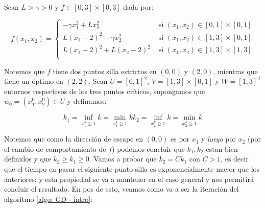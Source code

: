 \begin{remark}
	Sean $L > \gamma > 0$ y $f \in [0,3] \times [0,3]$ dada por:
	
	\begin{equation}
		f(x_1, x_2) = \left\lbrace \begin{array}{cc}
		- \gamma x_1^2 + Lx_2^2 & \text{ si } (x_1,x_2) \in [0,1] \times [0,1] \\
		L \left(x_1 - 2\right)^2 - \gamma x_2^2 & \text{ si } (x_1,x_2) \in [1,3] \times [0,1] \\
		L \left(x_1 - 2\right)^2 + L \left(x_2 - 2\right)^2 & \text{ si } (x_1,x_2) \in [1,3] \times [1,3] \\
		\end{array} \right.
	\end{equation}
	
	Notemos que $f$ tiene dos puntos silla estrictos en $(0,0)$ y $(2,0)$, mientras que tiene un \'optimo en $(2,2)$. Sean $U = [0,1]^2$, $V= [1,3] \times [0,1]$ y $W = [1,3]^2$ entornos respectivos de los tres puntos cr\'iticos, supongamos que $w_0 = \left(x^0_1, x^0_2\right) \in U$ y definamos:
	
	\begin{subequations}
		\begin{equation*}
			k_1 = \inf\limits_{x^k_1 \geq 1}{k} = \min\limits_{x^k_1 \geq 1}{k}
		\end{equation*}
		\begin{equation*}
		k_2 = \inf\limits_{x^k_2 \geq 1}{k} = \min\limits_{x^k_2 \geq 1}{k}
		\end{equation*}
	\end{subequations}
	
	Notemos que como la direcci\'on de escape en $(0,0)$ es por $x_1$ y \textit{luego} por $x_2$ (por el cambio de comportamiento de $f$) podemos concluir que $k_1,k_2$ estan bien definidos y que $k_2 \geq k_1 \geq 0$. Vamos a probar que $k_2 = Ck_1$ con $C>1$, es decir que el tiempo en pasar el siguiente punto silla es exponencialmente mayor que los anteriores; y esta propiedad se va a mantener en el caso general y nos permitir\'a concluir el resultado. En pos de esto, veamos como va a ser la iteraci\'on del algoritmo \ref{algo: GD - intro}:
	

\end{remark}
